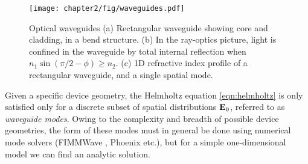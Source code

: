 \begin{figure}[t]
\centering
\texttt{[image: chapter2/fig/waveguides.pdf]}
\caption[Optical waveguides]{Optical waveguides (a) Rectangular waveguide showing core and cladding, in a bend structure. (b) In the ray-optics picture, light is confined in the waveguide by  total internal reflection when $n_1 \sin (\pi/2 - \phi) \ge n_2$. (c) 1D refractive index profile of a rectangular waveguide, and a single spatial mode.}
\label{fig:introduction-waveguides}
\end{figure}


Given a specific device geometry, the Helmholtz equation \ref{eqn:helmholtz} is only satisfied only for a discrete subset of spatial distributions $\mathbf{E}_0$, referred to as \emph{waveguide modes}. Owing to the complexity and breadth of possible device geometries, the form of these modes must in general be done using numerical mode solvers (FIMMWave \cite{Fimmwave}, Phoenix \cite{Phoenix} etc.), but for a simple one-dimensional model we can find an analytic solution. 

